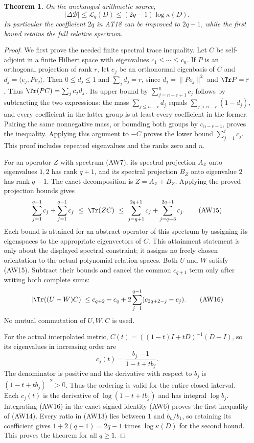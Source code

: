 \documentclass[10pt,a4paper,oneside]{report}
\newtheorem{theorem}{Theorem}[chapter]
\begin{document}
\begin{theorem}
On the unchanged arithmetic source,
\[
 |\Delta\mathcal B|\le\mathcal L_q(D)
                  \le(2q-1)\log\kappa(D).
 \tag{AW14}
\]
In particular the coefficient $2q$ in AT18 can be improved to
$2q-1$, while the first bound retains the full relative spectrum.
\end{theorem}
\begin{proof}
We first prove the needed finite spectral trace inequality.
Let $C$ be self-adjoint in a finite Hilbert space with eigenvalues
$c_1\le\cdots\le c_n$. If $P$ is an orthogonal projection of
rank $r$, let $e_j$ be an orthonormal eigenbasis of $C$ and
$d_j=\langle e_j,Pe_j\rangle$. Then $0\le d_j\le1$ and
$\sum_jd_j=r$, since $d_j=\|Pe_j\|^2$ and $\Tr P=r$.
Thus $\Tr(PC)=\sum_jc_jd_j$.
Its upper bound by $\sum_{j=n-r+1}^n c_j$ follows by subtracting
the two expressions: the mass $\sum_{j\le n-r}d_j$ equals
$\sum_{j>n-r}(1-d_j)$, and every coefficient in the latter
group is at least every coefficient in the former. Pairing the
same nonnegative mass, or bounding both groups by $c_{n-r+1}$,
proves the inequality. Applying this argument to $-C$ proves
the lower bound $\sum_{j=1}^r c_j$. This proof includes repeated
eigenvalues and the ranks zero and $n$.

For an operator $Z$ with spectrum (AW7), its spectral projection
$A_Z$ onto eigenvalues $1,2$ has rank $q+1$, and its spectral
projection $B_Z$ onto eigenvalue $2$ has rank $q-1$.
The exact decomposition is $Z=A_Z+B_Z$. Applying the proved
projection bounds gives
\[
 \sum_{j=1}^{q+1}c_j+\sum_{j=1}^{q-1}c_j
 \ \le\ \Tr(ZC)\ \le\
 \sum_{j=q+1}^{2q+1}c_j+\sum_{j=q+3}^{2q+1}c_j.
 \tag{AW15}
\]
Each bound is attained for an abstract operator of this spectrum
by assigning its eigenspaces to the appropriate eigenvectors
of $C$. This attainment statement is only about the displayed
spectral constraint; it assigns no freely chosen orientation
to the actual polynomial relation spaces.
Both $U$ and $W$ satisfy (AW15). Subtract their bounds and cancel
the common $c_{q+1}$ term only after writing both complete sums:
\[
 |\Tr((U-W)C)|
 \le c_{q+2}-c_q
       +2\sum_{j=1}^{q-1}(c_{2q+2-j}-c_j).
 \tag{AW16}
\]
No mutual commutation of $U,W,C$ is used.

For the actual interpolated metric,
$C(t)=((1-t)I+tD)^{-1}(D-I)$, so its eigenvalues in increasing
order are
\[
 c_j(t)=\frac{b_j-1}{1-t+tb_j}.
 \tag{AW17}
\]
The denominator is positive and the derivative with respect
to $b_j$ is $(1-t+tb_j)^{-2}>0$. Thus the ordering is valid
for the entire closed interval. Each $c_j(t)$ is the derivative
of $\log(1-t+tb_j)$ and has integral $\log b_j$.
Integrating (AW16) in the exact signed identity (AW6) proves
the first inequality of (AW14). Every ratio in (AW13) lies
between $1$ and $b_n/b_1$, so retaining its coefficient gives
$1+2(q-1)=2q-1$ times $\log\kappa(D)$ for the second bound.
This proves the theorem for all $q\ge1$.
\end{proof}
\end{document}

